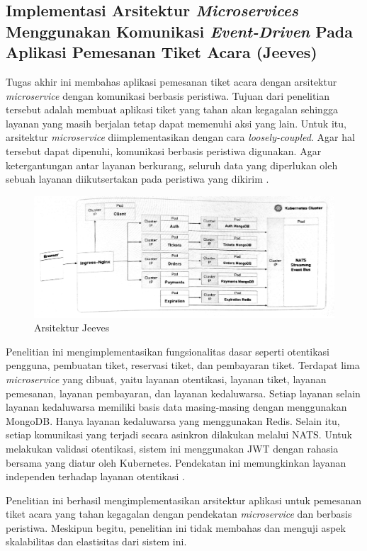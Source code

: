 \subsection{Implementasi Arsitektur \textit{Microservices} Menggunakan Komunikasi \textit{Event-Driven} Pada Aplikasi Pemesanan Tiket Acara (Jeeves)}

Tugas akhir ini membahas aplikasi pemesanan tiket acara dengan arsitektur \textit{microservice} dengan komunikasi berbasis peristiwa. Tujuan dari penelitian tersebut adalah membuat aplikasi tiket yang tahan akan kegagalan sehingga layanan yang masih berjalan tetap dapat memenuhi aksi yang lain. Untuk itu, arsitektur \textit{microservice} diimplementasikan dengan cara \textit{loosely-coupled}. Agar hal tersebut dapat dipenuhi, komunikasi berbasis peristiwa digunakan. Agar ketergantungan antar layanan berkurang, seluruh data yang diperlukan oleh sebuah layanan diikutsertakan pada peristiwa yang dikirim \parencite{microservicesEventDriven}.

\begin{figure}[htbp]
    \centering
    \includegraphics[width=1\textwidth]{resources/chapter-2/jeeves.png}
    \caption{Arsitektur Jeeves \parencite{microservicesEventDriven}}
    \label{fig:jeeves-architecture}
\end{figure}

Penelitian ini mengimplementasikan fungsionalitas dasar seperti otentikasi pengguna, pembuatan tiket, reservasi tiket, dan pembayaran tiket. Terdapat lima \textit{microservice} yang dibuat, yaitu layanan otentikasi, layanan tiket, layanan pemesanan, layanan pembayaran, dan layanan kedaluwarsa. Setiap layanan selain layanan kedaluwarsa memiliki basis data masing-masing dengan menggunakan MongoDB. Hanya layanan kedaluwarsa yang menggunakan Redis. Selain itu, setiap komunikasi yang terjadi secara asinkron dilakukan melalui NATS. Untuk melakukan validasi otentikasi, sistem ini menggunakan JWT dengan rahasia bersama yang diatur oleh Kubernetes. Pendekatan ini memungkinkan layanan independen terhadap layanan otentikasi \parencite{microservicesEventDriven}.

Penelitian ini berhasil mengimplementasikan arsitektur aplikasi untuk pemesanan tiket acara yang tahan kegagalan dengan pendekatan \textit{microservice} dan berbasis peristiwa. Meskipun begitu, penelitian ini tidak membahas dan menguji aspek skalabilitas dan elastisitas dari sistem ini.